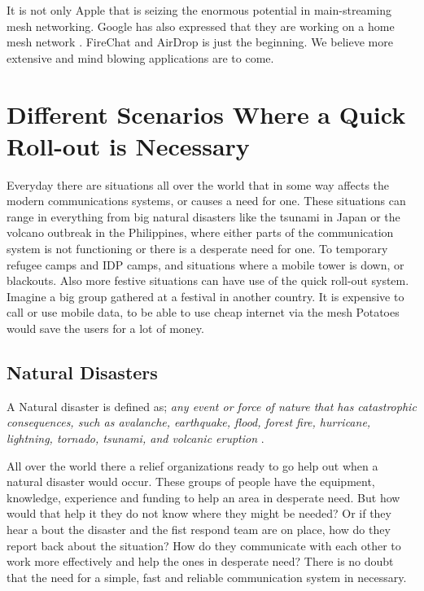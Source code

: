It is not only Apple that is seizing the enormous potential in main-streaming mesh networking. Google has also expressed that they are working on a home mesh network \cite{googleMesh}. FireChat and AirDrop is just the beginning. We believe more extensive and mind blowing applications are to come. 
 
\section{Different Scenarios Where a Quick Roll-out is Necessary}

Everyday there are situations all over the world that in some way affects the modern communications systems, or causes a need for one. These situations can range in everything from big natural disasters like the tsunami in Japan or the volcano outbreak in the Philippines, where either parts of the communication system is not functioning or there is a desperate need for one. To temporary refugee camps and IDP camps, and situations where a mobile tower is down, or blackouts. Also more festive situations can have use of the quick roll-out system. Imagine a big group gathered at a festival in another country. It is expensive to call or use mobile data, to be able to use cheap internet via the mesh Potatoes would save the users for a lot of money. 

\subsection{Natural Disasters}
A Natural disaster is defined as; \textit{any event or force of nature that has catastrophic consequences, such as avalanche, earthquake, flood, forest fire, hurricane, lightning, tornado, tsunami, and volcanic eruption} \cite{naturalDisaster}.

All over the world there a relief organizations ready to go help out when a natural disaster would occur. These groups of people have the equipment, knowledge, experience and funding to help an area in desperate need. But how would that help it they do not know where they might be needed? Or if they hear a bout the disaster and the fist respond team are on place, how do they report back about the situation? How do they communicate with each other to work more effectively and help the ones in desperate need? There is no doubt that the need for a simple, fast and reliable communication system in necessary. 

